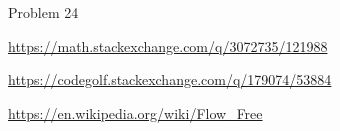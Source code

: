 \documentclass{article}
\begin{document}
\begin{references}
  \item Problem 24
  \item \url{https://math.stackexchange.com/q/3072735/121988}
  \item \url{https://codegolf.stackexchange.com/q/179074/53884}
  \item \url{https://en.wikipedia.org/wiki/Flow_Free}
\end{references}
\end{document}
